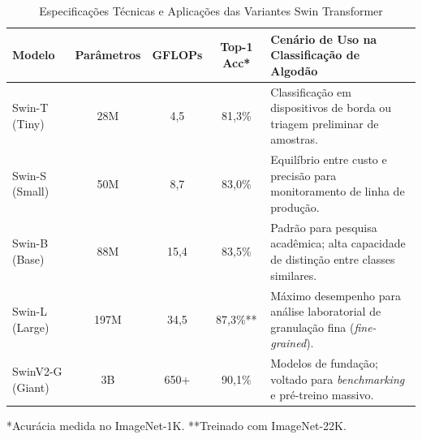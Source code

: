 \begin{table}[H]
\centering
\caption{Especificações Técnicas e Aplicações das Variantes Swin Transformer}
\label{tab:swin_variations}
\begin{tabular}{@{}lccc p{6cm}@{}}
\toprule
\textbf{Modelo} & \textbf{Parâmetros} & \textbf{GFLOPs} & \textbf{Top-1 Acc*} & \textbf{Cenário de Uso na Classificação de Algodão} \\ \midrule
Swin-T (Tiny) & 28M & 4,5 & 81,3\% & Classificação em dispositivos de borda ou triagem preliminar de amostras. \\
Swin-S (Small) & 50M & 8,7 & 83,0\% & Equilíbrio entre custo e precisão para monitoramento de linha de produção. \\
Swin-B (Base) & 88M & 15,4 & 83,5\% & Padrão para pesquisa acadêmica; alta capacidade de distinção entre classes similares. \\
Swin-L (Large) & 197M & 34,5 & 87,3\%** & Máximo desempenho para análise laboratorial de granulação fina (\textit{fine-grained}). \\ \midrule
SwinV2-G (Giant) & 3B & 650+ & 90,1\% & Modelos de fundação; voltado para \textit{benchmarking} e pré-treino massivo. \\ \bottomrule
\end{tabular}
\footnotesize{*Acurácia medida no ImageNet-1K. **Treinado com ImageNet-22K.}
\end{table}